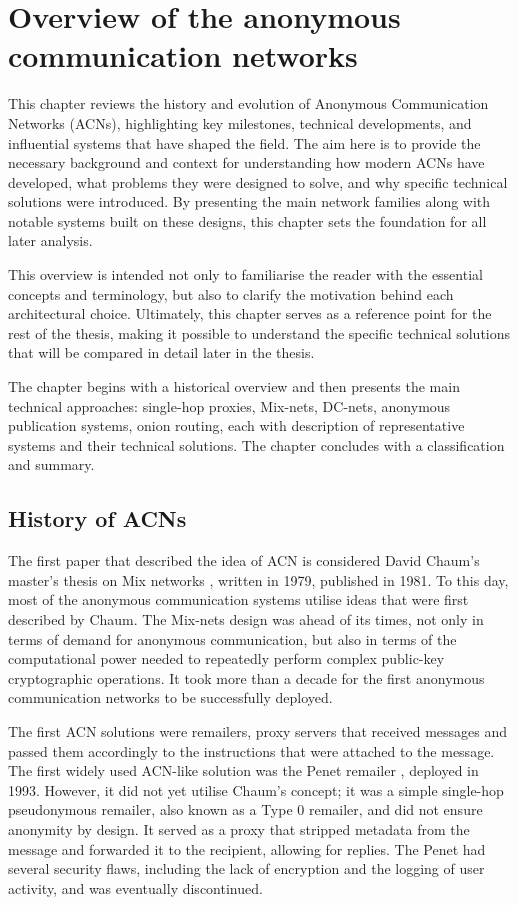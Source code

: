 \chapter{Overview of the anonymous communication networks }
\label{chap:Overview}

This chapter reviews the history and evolution of Anonymous Communication Networks (ACNs), highlighting key milestones, technical developments, and influential systems that have shaped the field. The aim here is to provide the necessary background and context for understanding how modern ACNs have developed, what problems they were designed to solve, and why specific technical solutions were introduced. By presenting the main network families along with notable systems built on these designs, this chapter sets the foundation for all later analysis.

This overview is intended not only to familiarise the reader with the essential concepts and terminology, but also to clarify the motivation behind each architectural choice. Ultimately, this chapter serves as a reference point for the rest of the thesis, making it possible to understand the specific technical solutions that will be compared in detail later in the thesis.

The chapter begins with a historical overview and then presents the main technical approaches: single-hop proxies, Mix-nets, DC-nets, anonymous publication systems, onion routing, each with description of representative systems and their technical solutions. The chapter concludes with a classification and summary.

\section{History of ACNs}
The first paper that described the idea of ACN is considered David Chaum's master's thesis on Mix networks \cite{Chaum81}, written in 1979, published in 1981. To this day, most of the anonymous communication systems utilise ideas that were first described by Chaum. The Mix-nets design was ahead of its times, not only in terms of demand for anonymous communication, but also in terms of the computational power needed to repeatedly perform complex public-key cryptographic operations. It took more than a decade for the first anonymous communication networks to be successfully deployed.

The first ACN solutions were remailers, proxy servers that received messages and passed them accordingly to the instructions that were attached to the message.
The first widely used ACN-like solution was the Penet remailer \cite{penet}, deployed in 1993. However, it did not yet utilise Chaum’s concept; it was a simple single-hop pseudonymous remailer, also known as a Type 0 remailer, and did not ensure anonymity by design. It served as a proxy that stripped metadata from the message and forwarded it to the recipient, allowing for replies. The Penet had several security flaws, including the lack of encryption and the logging of user activity, and was eventually discontinued.

